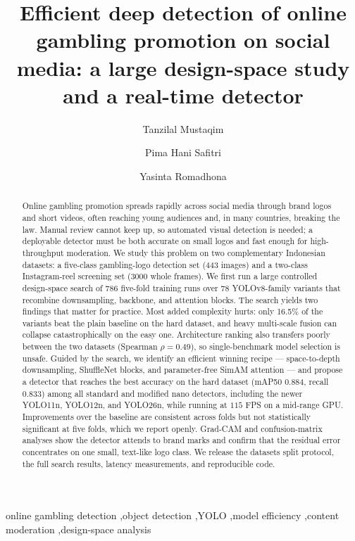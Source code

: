 \documentclass[preprint,review,12pt]{elsarticle}
\begin{document}
\begin{frontmatter}

\title{Efficient deep detection of online gambling promotion on social
media: a large design-space study and a real-time detector}

\author[telkom]{Tanzilal Mustaqim}
\author[telkom]{Pima Hani Safitri}
\author[telkom]{Yasinta Romadhona}


\begin{abstract}
Online gambling promotion spreads rapidly across social media through brand
logos and short videos, often reaching young audiences and, in many countries,
breaking the law. Manual review cannot keep up, so automated visual detection is
needed; a deployable detector must be both accurate on small logos and fast
enough for high-throughput moderation. We study this problem on two
complementary Indonesian datasets: a five-class gambling-logo detection set
(443 images) and a two-class Instagram-reel screening set (3000 whole frames).
We first run a large controlled design-space search of 786 five-fold training
runs over 78 YOLOv8-family variants that recombine downsampling, backbone, and
attention blocks. The search yields two findings that matter for practice. Most
added complexity hurts: only 16.5\% of the variants beat the plain baseline on
the hard dataset, and heavy multi-scale fusion can collapse catastrophically on
the easy one. Architecture ranking also transfers poorly between the two
datasets (Spearman $\rho=0.49$), so single-benchmark model selection is unsafe.
Guided by the search, we identify an efficient winning recipe --- space-to-depth
downsampling, ShuffleNet blocks, and parameter-free SimAM attention --- and
propose a detector that reaches the best accuracy on the hard dataset
(mAP50 $0.884$, recall $0.833$) among all standard and modified nano detectors,
including the newer YOLO11n, YOLO12n, and YOLO26n, while running at $115$ FPS on
a mid-range GPU. Improvements over the baseline are consistent across folds but
not statistically significant at five folds, which we report openly. Grad-CAM
and confusion-matrix analyses show the detector attends to brand marks and
confirm that the residual error concentrates on one small, text-like logo class.
We release the datasets split protocol, the full search results, latency
measurements, and reproducible code.
\end{abstract}

\begin{keyword}
online gambling detection \sep object detection \sep YOLO \sep model efficiency
\sep content moderation \sep design-space analysis
\end{keyword}

\end{frontmatter}
\end{document}
